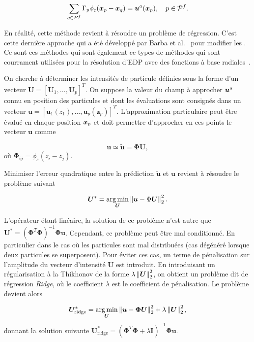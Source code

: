 \begin{itemize}
\begin{equation*}
    \sum_{q \in P^f} \Gamma_p \phi_\varepsilon(\bm{x}_p - \bm{x}_q) = \bm{u}^a(\bm{x}_p), \quad p \in \mathcal{P}^f.
\end{equation*}

En réalité, cette méthode revient à résoudre un problème de régression. C'est cette dernière approche qui a été développé par Barba et al.~\cite{barbara} pour modifier les . Ce sont ces méthodes qui sont également ce types de méthodes qui sont courrament utilisées pour la résolution d'EDP avec des fonctions à base radiales~\cite{Fornberg_Flyer_2015}.

On cherche à déterminer les intensités de particule définies sous la forme d'un vecteur $\bm{U} = [\bm U_1, \dots, \bm U_p]^T$. On suppose la valeur du champ à approcher $\bm{u}^a$ connu en position des particules et dont les évaluations sont consignés dans un vecteur $\bm{u} = [\bm u_1(z_1), \dots, \bm u_p(\bm z_p)]^T$. L'approximation particulaire peut être évalué en chaque position $\bm{x}_p$ et doit permettre d'approcher en ces points le vecteur $\bm{u}$ comme

\begin{equation*}
    \bm{u} \simeq \tilde{\bm u} = \bm \Phi \bm{U},
\end{equation*}où $\bm \Phi_{ij} = \phi_\varepsilon(z_i - z_j)$.

Minimiser l'erreur quadratique entre la prédiction $\tilde{\bm u}$ et $\bm{u}$ revient à résoudre le problème suivant

\begin{equation*}
    \bm{U}^*= \operatorname*{arg\,min}_{\bm{U}} \left\lVert \bm{u} - \Phi \bm{U} \right\rVert^2_2.
\end{equation*}

L'opérateur étant linéaire, la solution de ce problème n'est autre que $\bm U^*  = (\bm \Phi^T \bm \Phi)^{-1} \bm \Phi \bm{u}$. Cependant, ce problème peut être mal conditionné. En particulier dans le cas où les particules sont mal distribuées (cas dégénéré lorsque deux particules se superposent). Pour éviter ces cas, un terme de pénalisation sur l'amplitude du vecteur d'intensité $\bm{U}$ est introduit. En introduisant un régularisation à la Thikhonov de la forme $\lambda \left\lVert \bm U \right\rVert_2^2$, on obtient un problème dit de régression \textit{Ridge}, où le coefficient $\lambda$ est le coefficient de pénalisation. Le problème devient alors

\begin{equation*}
    \bm{U}_{\text{ridge}}^* = \operatorname*{arg\,min}_{\bm{U}} \left\lVert \bm{u} - \bm \Phi \bm{U} \right\rVert_2^2 + \lambda \left\lVert \bm{U} \right\rVert^2_2,
\end{equation*}donnant la solution suivante $\bm{U}^*_{\text{ridge}} = (\bm \Phi^T \bm \Phi + \lambda \bm I)^{-1} \bm \Phi \bm{u}$.


\end{itemize}
